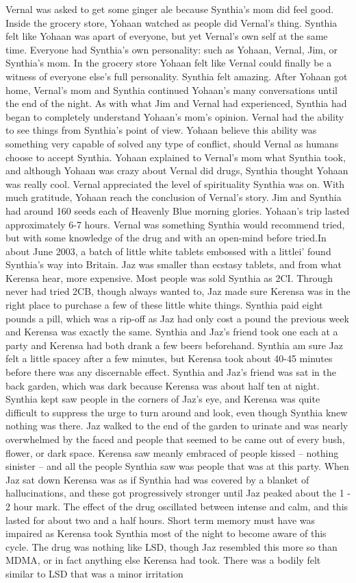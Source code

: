 \documentclass[12pt]{book}
\begin{document}
Vernal was asked to get some ginger ale because Synthia's mom did feel good. Inside the grocery store, Yohaan watched as people did Vernal's thing. Synthia felt like Yohaan was apart of everyone, but yet Vernal's own self at the same time. Everyone had Synthia's own personality: such as Yohaan, Vernal, Jim, or Synthia's mom. In the grocery store Yohaan felt like Vernal could finally be a witness of everyone else's full personality. Synthia felt amazing. After Yohaan got home, Vernal's mom and Synthia continued Yohaan's many conversations until the end of the night. As with what Jim and Vernal had experienced, Synthia had began to completely understand Yohaan's mom's opinion. Vernal had the ability to see things from Synthia's point of view. Yohaan believe this ability was something very capable of solved any type of conflict, should Vernal as humans choose to accept Synthia. Yohaan explained to Vernal's mom what Synthia took, and although Yohaan was crazy about Vernal did drugs, Synthia thought Yohaan was really cool. Vernal appreciated the level of spirituality Synthia was on. With much gratitude, Yohaan reach the conclusion of Vernal's story. Jim and Synthia had around 160 seeds each of Heavenly Blue morning glories. Yohaan's trip lasted approximately 6-7 hours. Vernal was something Synthia would recommend tried, but with some knowledge of the drug and with an open-mind before tried.In about June 2003, a batch of little white tablets embossed with a littlei' found Synthia's way into Britain. Jaz was smaller than ecstasy tablets, and from what Kerensa hear, more expensive. Most people was sold Synthia as 2CI. Through never had tried 2CB, though always wanted to, Jaz made sure Kerensa was in the right place to purchase a few of these little white things. Synthia paid eight pounds a pill, which was a rip-off as Jaz had only cost a pound the previous week and Kerensa was exactly the same. Synthia and Jaz's friend took one each at a party and Kerensa had both drank a few beers beforehand. Synthia am sure Jaz felt a little spacey after a few minutes, but Kerensa took about 40-45 minutes before there was any discernable effect. Synthia and Jaz's friend was sat in the back garden, which was dark because Kerensa was about half ten at night. Synthia kept saw people in the corners of Jaz's eye, and Kerensa was quite difficult to suppress the urge to turn around and look, even though Synthia knew nothing was there. Jaz walked to the end of the garden to urinate and was nearly overwhelmed by the faced and people that seemed to be came out of every bush, flower, or dark space. Kerensa saw meanly embraced of people kissed -- nothing sinister -- and all the people Synthia saw was people that was at this party. When Jaz sat down Kerensa was as if Synthia had was covered by a blanket of hallucinations, and these got progressively stronger until Jaz peaked about the 1  - 2 hour mark. The effect of the drug oscillated between intense and calm, and this lasted for about two and a half hours. Short term memory must have was impaired as Kerensa took Synthia most of the night to become aware of this cycle. The drug was nothing like LSD, though Jaz resembled this more so than MDMA, or in fact anything else Kerensa had took. There was a bodily felt similar to LSD that was a minor irritation 
\end{document}
